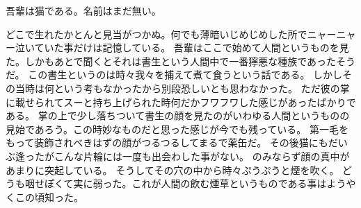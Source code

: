 \documentclass[12pt,a4paper]{ltjsarticle}
\begin{document}
吾輩は猫である。名前はまだ無い。

どこで生れたかとんと見当がつかぬ。何でも薄暗いじめじめした所でニャーニャー泣いていた事だけは記憶している。
吾輩はここで始めて人間というものを見た。しかもあとで聞くとそれは書生という人間中で一番獰悪な種族であったそうだ。
この書生というのは時々我々を捕えて煮て食うという話である。
しかしその当時は何という考もなかったから別段恐しいとも思わなかった。
ただ彼の掌に載せられてスーと持ち上げられた時何だかフワフワした感じがあったばかりである。
掌の上で少し落ちついて書生の顔を見たのがいわゆる人間というものの見始であろう。この時妙なものだと思った感じが今でも残っている。
第一毛をもって装飾されべきはずの顔がつるつるしてまるで薬缶だ。
その後猫にもだいぶ逢ったがこんな片輪には一度も出会わした事がない。
のみならず顔の真中があまりに突起している。
そうしてその穴の中から時々ぷうぷうと煙を吹く。
どうも咽せぽくて実に弱った。これが人間の飲む煙草というものである事はようやくこの頃知った。


\end{document}
